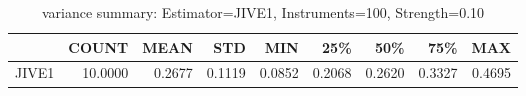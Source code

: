 \begin{table}[ht]
\centering
\caption{variance summary: Estimator=JIVE1, Instruments=100, Strength=0.10}
\begin{tabular}{lrrrrrrrr}
\toprule
 & COUNT & MEAN & STD & MIN & 25\% & 50\% & 75\% & MAX \\
\midrule
JIVE1 & 10.0000 & 0.2677 & 0.1119 & 0.0852 & 0.2068 & 0.2620 & 0.3327 & 0.4695 \\
\bottomrule
\end{tabular}
\end{table}
